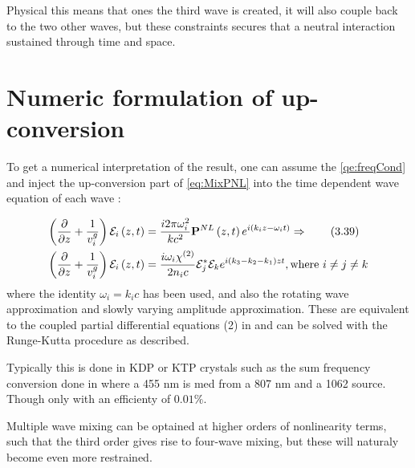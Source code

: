 Physical this means that ones the third wave is created, it will also couple back to
the two other waves, but these constraints secures that a neutral interaction sustained through time and space. 




\section{Numeric formulation of up-conversion}
\label{sec:mixing-numeric}

To get a numerical interpretation of the result, one can assume the
\cref{qe:freqCond} and inject the up-conversion part of \cref{eq:MixPNL} into the time dependent wave equation of each wave \cite[Equation 3.39]{shen}:

\begin{align*}
\left( \frac{\partial }{\partial z}  + \frac{1}{v_i^{g}} \right) \mathcal{E}_i \left(z, t\right)
&= \frac{i 2 \pi \omega_i^{2}}{k c^2} \mathbf{P}^{NL} \left(z,t\right) e^{i \left(k_i z - \omega_{i}
    t\right)} \Rightarrow \tag{3.39}\\
\left( \frac{\partial }{\partial z}  + \frac{1}{v_i^{g}} \right) \mathcal{E}_i \left(z, t\right)
&= \frac{i \omega_i \chi^{(2)}}{2 n_i c} \mathcal{E}_j^{*}\mathcal{E}_k e^{i (k_3 - k_2 -k_1) z
  t}, \text{where } i \neq j \neq k \\
\end{align*}
where the identity $\omega_i = k_ic$ has been used, and also the rotating wave
approximation and slowly varying amplitude approximation. These are equivalent to
the coupled partial differential
equations  (2) in \cite{bakker} and can be solved with the Runge-Kutta procedure
as described.

Typically this is done in KDP or KTP crystals such as the sum frequency conversion
done in \cite{sumFreq} where a 455 nm is med from a 807 nm and a 1062 source. Though only with an efficienty of $0.01\%$.

Multiple wave mixing can be optained at higher orders of nonlinearity terms, such
that the third order gives rise to four-wave mixing, but these will naturaly become
even more restrained. 


